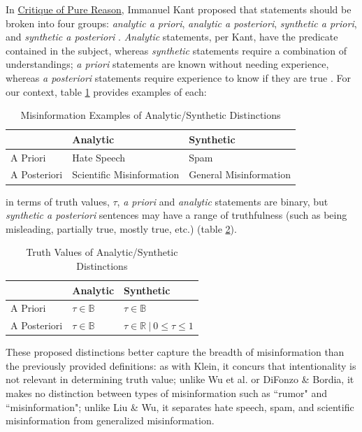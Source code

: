 \documentclass[preprint,review,12pt]{elsarticle}
\begin{document}
In \underline{Critique of Pure Reason}, Immanuel Kant proposed that statements should be broken into four groups: \textit{analytic a priori}, \textit{analytic a posteriori}, \textit{synthetic a priori}, and \textit{synthetic a posteriori} \cite{kant1908critique,frege1988collected,quine1951main}. \textit{Analytic} statements, per Kant, have the predicate contained in the subject, whereas \textit{synthetic} statements require a combination of understandings; \textit{a priori} statements are known without needing experience, whereas \textit{a posteriori} statements require experience to know if they are true \cite{wright1997companion}. For our context, table \ref{tab:misinformationexamples} provides examples of each:
\begin{table}[htbp]
    \centering
    \begin{tabular}{ |p{3cm}|p{5cm}|p{5cm}|}
    \hline
    & Analytic & Synthetic\\
    \hline
    A Priori & Hate Speech & Spam\\
    \hline
    A Posteriori &  Scientific Misinformation  & General Misinformation\\
    \hline
    \end{tabular}
    \caption{Misinformation Examples of Analytic/Synthetic Distinctions}
    \label{tab:misinformationexamples}
\end{table}
in terms of truth values, $\tau$, \textit{a priori} and \textit{analytic} statements are binary, but \textit{synthetic a posteriori} sentences may have a range of truthfulness (such as being misleading, partially true, mostly true, etc.) (table \ref{tab:truthvalues}).

\begin{table}[h!]
\centering
\begin{tabular}{ |p{3cm}|p{5cm}|p{5cm}|}
 \hline
  & Analytic & Synthetic\\
 \hline
 A Priori & $\tau \in \mathbb{B}$ & $\tau \in \mathbb{B}$\\
 \hline
 A Posteriori &  $\tau \in \mathbb{B}$  & $\tau \in \mathbb{R} \ | \ 0 \leq \tau \leq 1$ \\
 \hline
\end{tabular}
\caption{Truth Values of Analytic/Synthetic Distinctions}
\label{tab:truthvalues}
\end{table}

These proposed distinctions better capture the breadth of misinformation than the previously provided definitions: as with Klein, it concurs that intentionality is not relevant in determining truth value; unlike Wu et al. or DiFonzo \& Bordia, it makes no distinction between types of misinformation such as ``rumor" and ``misinformation"; unlike Liu \& Wu, it separates hate speech, spam, and scientific misinformation from generalized misinformation.
\end{document}

